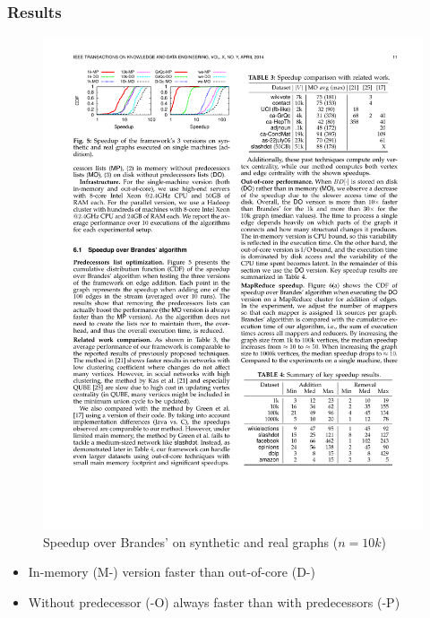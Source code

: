 \begin{frame}
  \frametitle{Results}

  \begin{figure}[t]
    \centering
    \includegraphics[width=\textwidth, height=0.6\textheight, keepaspectratio]{imgs/kdb-results1}
    \caption{Speedup over Brandes' on synthetic and real graphs ($n = 10k$)}
  \end{figure}

  \begin{itemize}
    \item In-memory (M-) version faster than out-of-core (D-)
    \item Without predecessor (-O) always faster than with predecessors (-P)
  \end{itemize}

\end{frame}


